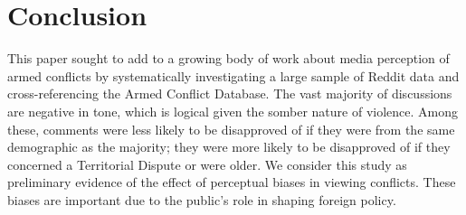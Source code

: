 \section{Conclusion}
This paper sought to add to a growing body of work about media perception of armed conflicts by systematically investigating a large sample of Reddit data and cross-referencing the Armed Conflict Database. The vast majority of discussions are negative in tone, which is logical given the somber nature of violence. Among these, comments were less likely to be disapproved of if they were from the same demographic as the majority; they were more likely to be disapproved of if they concerned a Territorial Dispute or were older. We consider this study as preliminary evidence of the effect of perceptual biases in viewing conflicts. These biases are important due to the public's role in shaping foreign policy.